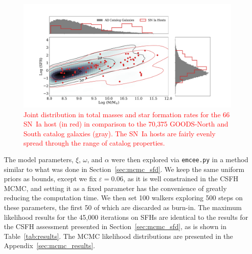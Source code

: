 \documentclass[apj, linenumbers]{aastex62}
\begin{document}

\begin{figure}[t] %
   \centering
   \includegraphics[width=6.5in]{figure_contours.pdf} 
   \caption{\footnotesize \textcolor{red}{Joint distribution in total masses and star formation rates for the 66 SN~Ia host (in red) in comparison to the 70,375 GOODS-North and South catalog galaxies (gray). The SN~Ia hosts are fairly evenly spread through the range of catalog properties.}}
   \label{fig:figure_cdfs}
\end{figure}

The model parameters, $\xi$, $\omega$, and $\alpha$ were then explored via {\tt emcee.py} in a method similar to what was done in Section~\ref{sec:mcmc_sfd}. We keep the same uniform priors as bounds, except we fix $\varepsilon=0.06$, as it is well constrained in the CSFH MCMC, and setting it as a fixed parameter has the convenience of greatly reducing the computation time. We then set 100 walkers exploring 500 steps on these parameters, the first 50 of which are discarded as burn-in. The maximum likelihood results for the 45,000 iterations on SFHs are identical to the results for the CSFH assessment presented in Section~\ref{sec:mcmc_sfd}, as is shown in Table~\ref{tab:results}. The MCMC likelihood distributions are presented in the Appendix~\ref{sec:mcmc_results}.
\end{document}
